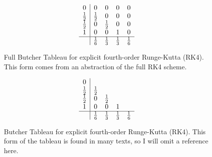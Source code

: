\documentclass[onecolumn,titlepage,letterpaper,10pt]{article}
\begin{document}
\begin{figure}[h!]
    {\renewcommand\arraystretch{1.2}
    \begin{equation*}
        \begin{array}{ c|ccccc }
            0              & 0           & 0           & 0      &0\\
            \frac{1}{2}    & \frac{1}{2} & 0           & 0      &0\\
            \frac{1}{2}    & 0           & \frac{1}{2} & 0      &0\\
            1              & 0           & 0           & 1      &0\\
            \hline
            & \frac{1}{6} & \frac{1}{3}& \frac{1}{3}  & \frac{1}{6}\\
        \end{array}
    \end{equation*}
    \caption[Full Butcher Tableau for explicit fourth-order Runge-Kutta (RK4)] {
                Full Butcher Tableau for explicit fourth-order Runge-Kutta (RK4).
				This form comes from an abstraction of the full RK4 scheme.
            }
    \label{fig: full rk4 butcher}
    }
\end{figure}

\begin{figure}[h!]
    {\renewcommand\arraystretch{1.2}
    \begin{equation*}
        \begin{array}{ c|ccccc }
            0              &             &             &        &\\
            \frac{1}{2}    & \frac{1}{2} &             &        &\\
            \frac{1}{2}    & 0           & \frac{1}{2} &        &\\
            1              & 0           & 0           & 1      &\\
            \hline
            & \frac{1}{6} & \frac{1}{3}& \frac{1}{3}  & \frac{1}{6}\\
        \end{array}
    \end{equation*}
    \caption[Butcher Tableau for explicit fourth-order Runge-Kutta (RK4)] {
                Butcher Tableau for explicit fourth-order Runge-Kutta (RK4).
                This form of the tableau is found in many texts, so I will
                omit a reference here.
            }
    \label{fig: RK4 butcher tableau}
    }
\end{figure}
\end{document}
